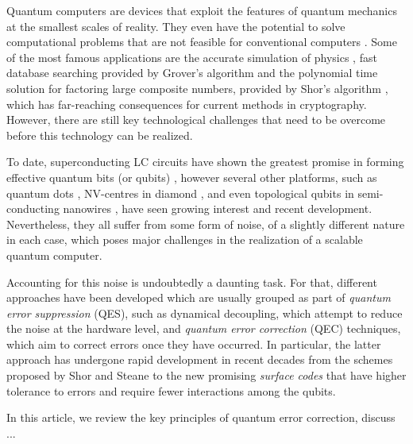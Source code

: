 Quantum computers are devices that exploit the features of quantum mechanics at
the smallest scales of reality. They even have the potential to solve
computational problems that are not feasible for conventional computers
\cite{nielsen_chuang_2010}. Some of the most famous applications are the
accurate simulation of physics \cite{feynman82_simul_physic_with_comput}, fast
database searching provided by Grover's algorithm \cite{Grover_1996} and the
polynomial time solution for factoring large composite numbers, provided by
Shor's algorithm \cite{Shor_1997}, which has far-reaching consequences for
current methods in cryptography. However, there are still key technological
challenges that need to be overcome before this technology can be realized.

To date, superconducting LC circuits have shown the greatest promise in forming
effective quantum bits (or qubits) \cite{Rol_2019}
\cite{barends14_super_quant_circuit_at_surfac}, however several other platforms,
such as quantum dots \cite{huang19_fidel_bench_two_qubit_gates_silic}
\cite{Lawrie_2020}, NV-centres in diamond \cite{Taminiau_2014}, and even
topological qubits in semi-conducting nanowires \cite{Mourik_2012}, have seen
growing interest and recent development. Nevertheless, they all suffer from some
form of noise, of a slightly different nature in each case, which poses
major challenges in the realization of a scalable quantum computer.

Accounting for this noise is undoubtedly a daunting task. For that, different
approaches have been developed which are usually grouped as part of
\textit{quantum error suppression} (QES), such as dynamical decoupling, which
attempt to reduce the noise at the hardware level, and \textit{quantum error
  correction} (QEC) techniques, which aim to correct errors once they have
occurred. In particular, the latter approach has undergone rapid development in
recent decades from the schemes proposed by Shor \cite{Shor_1995_QEC} and Steane
\cite{Steane_1996_QEC} to the new promising \textit{surface codes}
\cite{fowler12_surfac_codes} that have higher tolerance to errors and require
fewer interactions among the qubits.

In this article, we review the key principles of quantum error correction,
discuss ...

